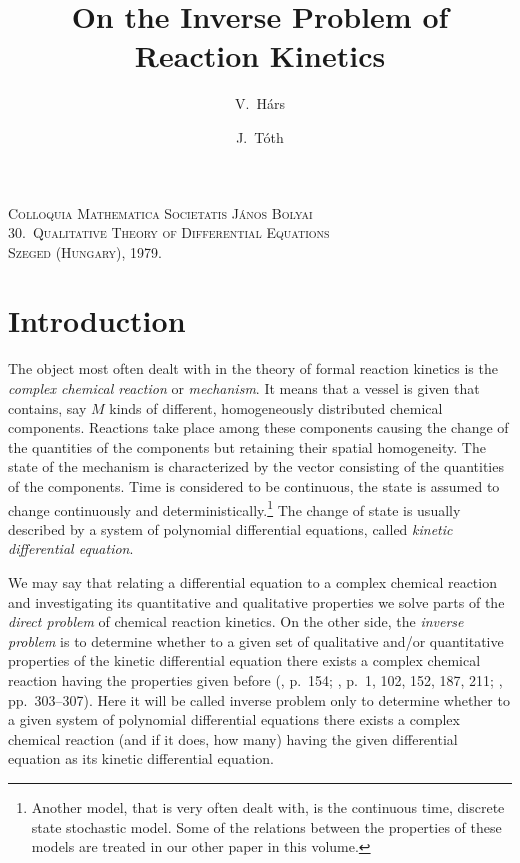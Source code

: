 \documentclass[12pt,a4paper]{article}
\title{On the Inverse Problem of Reaction Kinetics}
\author{V.\ H\'ars \and J.\ T\'oth}
\date{}
\begin{document}
\maketitle

\begin{center}
\textsc{Colloquia Mathematica Societatis J\'anos Bolyai}\\
\textsc{30.\ Qualitative Theory of Differential Equations}\\
\textsc{Szeged (Hungary), 1979.}
\end{center}

\bigskip

\section{Introduction}

The object most often dealt with in the theory of formal reaction kinetics is the \emph{complex chemical reaction} or \emph{mechanism}.  It means that a vessel is given that contains, say $M$ kinds of different, homogeneously distributed chemical components.  Reactions take place among these components causing the change of the quantities of the components but retaining their spatial homogeneity.  The state of the mechanism is characterized by the vector consisting of the quantities of the components.  Time is considered to be continuous, the state is assumed to change continuously and deterministically.\footnote{Another model, that is very often dealt with, is the continuous time, discrete state stochastic model.  Some of the relations between the properties of these models are treated in our other paper \cite{ErdiTothHars1979} in this volume.}
The change of state is usually described by a system of polynomial differential equations, called \emph{kinetic differential equation}.

We may say that relating a differential equation to a complex chemical reaction and investigating its quantitative and qualitative properties we solve parts of the \emph{direct problem} of chemical reaction kinetics.  On the other side, the \emph{inverse problem} is to determine whether to a given set of qualitative and/or quantitative properties of the kinetic differential equation there exists a complex chemical reaction having the properties given before (\cite{Emanuel1975}, p.~154; \cite{Jacquez1972}, p.~1, 102, 152, 187, 211; \cite{TothErdi1978}, pp.~303--307).  Here it will be called inverse problem only to determine whether to a given system of polynomial differential equations there exists a complex chemical reaction (and if it does, how many) having the given differential equation as its kinetic differential equation.
\end{document}
